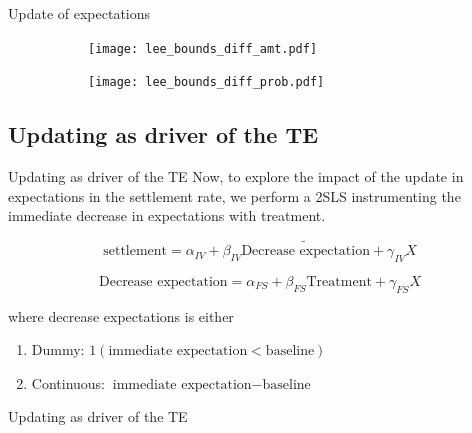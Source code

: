 \documentclass[8pt]{beamer}
\begin{document}
\begin{frame}{Update of expectations}

\begin{figure}[H]
    \begin{center}
        \begin{subfigure}{0.49\textwidth}
            \centering
            \texttt{[image: lee\_bounds\_diff\_amt.pdf]}
        \end{subfigure}
        \begin{subfigure}{0.49\textwidth}
                \centering
                \texttt{[image: lee\_bounds\_diff\_prob.pdf]}
        \end{subfigure}
    \end{center} 
\end{figure} 
 
 
\end{frame}


\subsection{Updating as driver of the TE}
\begin{frame}{Updating as driver of the TE}
Now, to explore the impact of the update in expectations in the settlement rate, we perform a 2SLS instrumenting the immediate decrease in expectations with treatment.

\[\text{settlement}=\alpha_{IV}+\beta_{IV}\widetilde{\text{Decrease expectation}}+\gamma_{IV}X\]

\[\text{Decrease expectation}=\alpha_{FS}+\beta_{FS}\text{Treatment}+\gamma_{FS}X\]

where decrease expectations is either
\begin{enumerate}
    \item Dummy: $1(\text{immediate expectation}<\text{baseline})$
    \item Continuous: $\text{immediate expectation}-\text{baseline}$
\end{enumerate}
\end{frame}

\begin{frame}{Updating as driver of the TE}

\begin{table}[H]
\caption{Immediate updating in 2M settlement}
\begin{center}
\tiny{}
\end{center}
\end{table}     
\end{frame}
\end{document}

